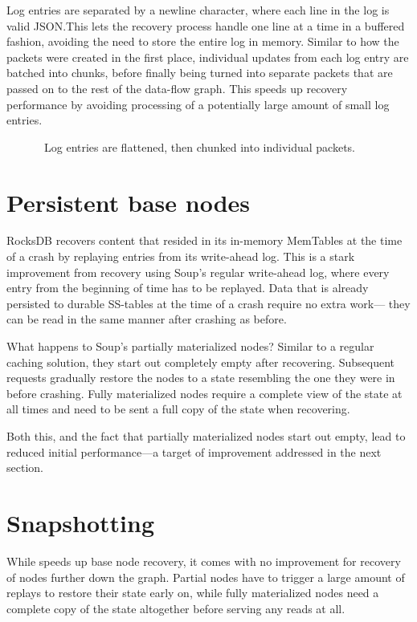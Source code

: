 Log entries are separated by a newline character, where each line in the log is
valid JSON.\@ This lets the recovery process handle one line at a time in a
buffered fashion, avoiding the need to store the entire log in memory. Similar
to how the packets were created in the first place, individual updates from each
log entry are batched into chunks, before finally being turned into separate
packets that are passed on to the rest of the data-flow graph. This speeds up
recovery performance by avoiding processing of a potentially large amount of
small log entries.


\begin{figure}[H]
  
  \caption{\
    Log entries are flattened, then chunked into individual packets.
  }\label{fig:log-chunking}
\end{figure}

\section{Persistent base nodes}

RocksDB recovers content that resided in its in-memory MemTables at the time of
a crash by replaying entries from its write-ahead log. This is a stark
improvement from recovery using Soup's regular write-ahead log, where every
entry from the beginning of time has to be replayed. Data that is already
persisted to durable SS-tables at the time of a crash require no extra work---
they can be read in the same manner after crashing as before.

What happens to Soup's partially materialized nodes? Similar to a regular
caching solution, they start out completely empty after recovering. Subsequent
requests gradually restore the nodes to a state resembling the one they were in
before crashing. Fully materialized nodes require a complete view of the state
at all times and need to be sent a full copy of the state when recovering.

Both this, and the fact that partially materialized nodes start out empty, lead
to reduced initial performance---a target of improvement addressed in the next
section.

\section{Snapshotting}\label{sec:snapshotting}

While  speeds up base node recovery, it comes with no
improvement for recovery of nodes further down the graph. Partial nodes have to
trigger a large amount of replays to restore their state early on, while fully
materialized nodes need a complete copy of the state altogether before serving
any reads at all.

